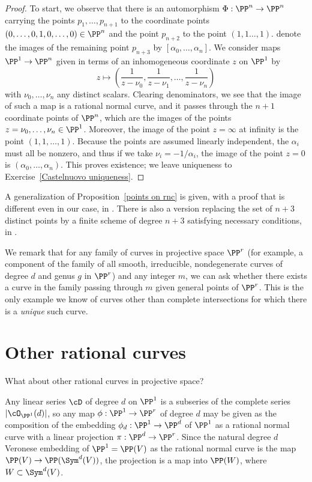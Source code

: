 \begin{proof}
To start, we observe that there is an automorphism $\Phi : \PP^n \to \PP^n$ carrying the points $p_1,\dots,p_{n+1}$ to the coordinate points $(0,\dots,0,1,0,\dots,0)\in \PP^n$ and the point $p_{n+2}$ to the point $(1,1\dots,1)$.  denote the images of the remaining  point $p_{n+3}$  by $[\alpha_0,\dots,\alpha_n]$. We consider maps $\PP^1 \to \PP^n$ given in terms of an inhomogeneous coordinate $z$ on $\PP^1$ by
$$
z \mapsto \left( \frac{1}{z - \nu_0}, \frac{1}{z - \nu_1} , \dots, \frac{1}{z - \nu_n}  \right)
$$
with $\nu_0,\dots,\nu_n$ any distinct scalars. Clearing denominators, we see that the image of such a map is a rational normal curve, and it passes through the $n+1$ coordinate points of $\PP^n$, which are the images of the points $z = \nu_0, \dots, \nu_n \in \PP^1$. Moreover, the image of the point $z = \infty$ at infinity is the point $(1,1, \dots,1)$. Because the points are assumed linearly independent, the $\alpha_i$ must all be nonzero, and thus if we take  $\nu_i = -1/\alpha_i$, the image of the point $z = 0$ is $(\alpha_0,\dots,\alpha_n)$. This proves existence; we leave uniqueness to Exercise~\ref{Castelnuovo uniqueness}. 
\end{proof}

\begin{fact}
A generalization of Proposition~\ref{points on rnc} is given, with a proof that is different
even in our case, in \cite[Proposition 3.19]{Montreal}.  There is also a version replacing the set of $n+3$ distinct points by a  finite
scheme of degree $n+3$ satisfying necessary conditions, in \cite{EHLGP}.
\end{fact}

We remark that for any family of curves in projective space $\PP^r$ (for example, a component of the family of all smooth, irreducible, nondegenerate curves of degree $d$ and genus $g$ in $\PP^r$) and any integer $m$, we can ask whether there exists a curve in the family passing through $m$ given general points of $\PP^r$. This is the only example we know of curves other than complete intersections for which there is a \emph{unique} such curve.


\section{Other rational curves}

What about other rational curves in projective space? 

Any linear series $\cD$ of degree $d$ on $\PP^1$ is a subseries of the complete series $|\cO_{\PP^1}(d)|$, so any map $\phi : \PP^1 \to \PP^r$ of degree $d$ may be given as the
composition of the embedding $\phi_d : \PP^1 \to \PP^d$ of $\PP^1$ as a rational normal curve with a linear projection $\pi : \PP^d \to \PP^r$. Since the natural degree $d$ Veronese embedding of $\PP^1 = \PP(V)$ as the rational normal curve is the map
$\PP(V) \to \PP(\Sym^d(V))$, the projection is a map into $\PP(W)$, where $W\subset \Sym^d(V)$. 

